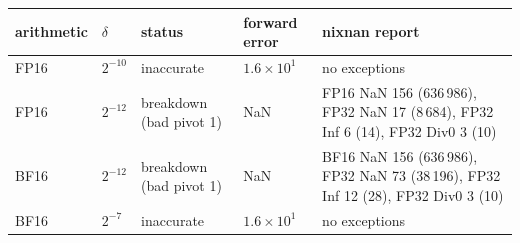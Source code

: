 \begin{tabular}{llllp{5.4cm}}
\toprule
arithmetic & $\delta$ & status & forward error & nixnan report\\
\midrule
FP16 & $2^{-10}$ & inaccurate & $1.6\!\times\!10^{1}$ & no exceptions\\
FP16 & $2^{-12}$ & breakdown (bad pivot 1) & NaN & FP16 NaN 156 (636\,986), FP32 NaN 17 (8\,684), FP32 Inf 6 (14), FP32 Div0 3 (10)\\
BF16 & $2^{-12}$ & breakdown (bad pivot 1) & NaN & BF16 NaN 156 (636\,986), FP32 NaN 73 (38\,196), FP32 Inf 12 (28), FP32 Div0 3 (10)\\
BF16 & $2^{-7}$ & inaccurate & $1.6\!\times\!10^{1}$ & no exceptions\\
\bottomrule
\end{tabular}
